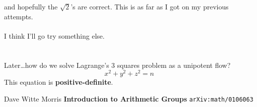 \documentclass[12pt]{article}
\begin{document}
and hopefully the $\sqrt{2}$'s are correct. This is as far as I got on my previous attempts. \\ \\ I think I'll go try something else.
\\ \\ \\
Later\dots how do we solve Lagrange's 3 squares problem as a unipotent flow?
$$  x^2 + y^2 + z^2 = n $$
This equation is \textbf{positive-definite}.
\vfill

\begin{thebibliography}{}

\item Dave Witte Morris \textbf{Introduction to Arithmetic Groups} \texttt{arXiv:math/0106063}

\end{thebibliography}
\end{document}
